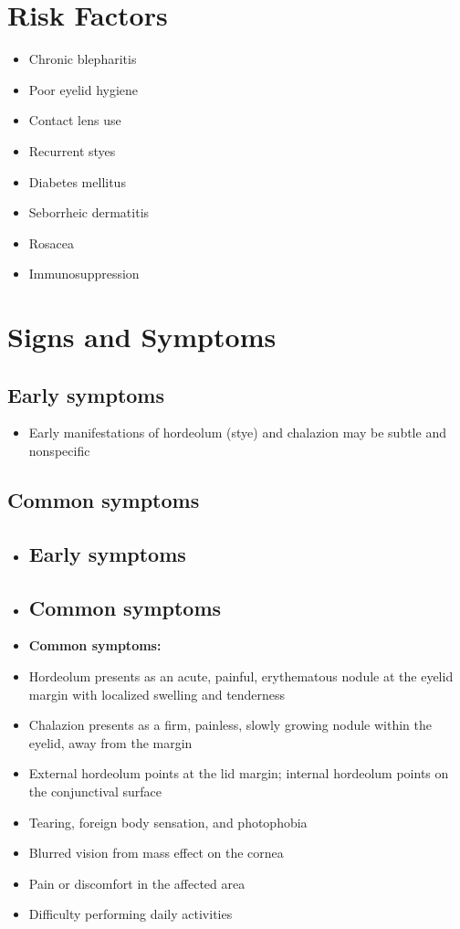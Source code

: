 \section{Risk Factors}

\begin{itemize}[noitemsep]
  \item Chronic blepharitis
  \item Poor eyelid hygiene
  \item Contact lens use
  \item Recurrent styes
  \item Diabetes mellitus
  \item Seborrheic dermatitis
  \item Rosacea
  \item Immunosuppression
\end{itemize}

\section{Signs and Symptoms}

\subsection{Early symptoms}
\begin{itemize}[noitemsep]
  \item Early manifestations of hordeolum (stye) and chalazion may be subtle and nonspecific
\end{itemize}

\subsection{Common symptoms}
\begin{itemize}[noitemsep]
  \item \subsection{Early symptoms}
  \item \subsection{Common symptoms}
  \item \textbf{Common symptoms:}
  \item Hordeolum presents as an acute, painful, erythematous nodule at the eyelid margin with localized swelling and tenderness
  \item Chalazion presents as a firm, painless, slowly growing nodule within the eyelid, away from the margin
  \item External hordeolum points at the lid margin; internal hordeolum points on the conjunctival surface
  \item Tearing, foreign body sensation, and photophobia
  \item Blurred vision from mass effect on the cornea
  \item Pain or discomfort in the affected area
  \item Difficulty performing daily activities
\end{itemize}

